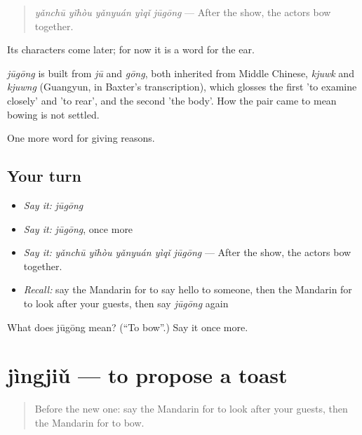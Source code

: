 \begin{quote}
\emph{yǎnchū yǐhòu yǎnyuán yìqǐ jūgōng} — After the show, the actors bow together.
\end{quote}

Its characters come later; for now it is a word for the ear.

\begin{cousinweb}
\emph{jūgōng} is built from \emph{jū} and \emph{gōng}, both inherited from Middle Chinese, \emph{kjuwk} and \emph{kjuwng} (Guangyun, in Baxter's transcription), which glosses the first 'to examine closely' and 'to rear', and the second 'the body'. How the pair came to mean bowing is not settled.
\end{cousinweb}

\begin{grammarlens}[title={What you've built}]
One more word for giving reasons.
\end{grammarlens}

\subsection*{Your turn}
\begin{itemize}
\raggedright
  \item \emph{Say it:} \emph{jūgōng}
  \item \emph{Say it:} \emph{jūgōng}, once more
  \item \emph{Say it:} \emph{yǎnchū yǐhòu yǎnyuán yìqǐ jūgōng} — After the show, the actors bow together.
  \item \emph{Recall:} say the Mandarin for to say hello to someone, then the Mandarin for to look after your guests, then say \emph{jūgōng} again
\end{itemize}

\begin{tcolorbox}[breakable,colback=teal!4,colframe=teal!35!black,title={Before you move on}]
What does jūgōng mean? (\textquotedblleft{}To bow\textquotedblright{}.) Say it once more.
\end{tcolorbox}
\section[jìngjiǔ]{jìngjiǔ — to propose a toast}

\label{lesson:ZH-C361-jingjiu}



\begin{quote}
Before the new one: say the Mandarin for to look after your guests, then the Mandarin for to bow.
\end{quote}

